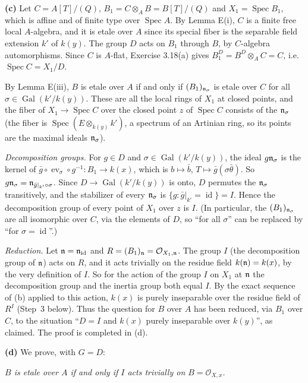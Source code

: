\documentclass[11pt]{article}
\begin{document}
\textbf{(c)} Let $C=A[T]/(Q)$, $B_1=C\otimes_AB=B[T]/(Q)$ and $X_1=\operatorname{Spec}B_1$, which is affine and of finite type over $\operatorname{Spec}A$. By Lemma E(i), $C$ is a finite free local $A$-algebra, and it is etale over $A$ since its special fiber is the separable field extension $k'$ of $k(y)$. The group $D$ acts on $B_1$ through $B$, by $C$-algebra automorphisms. Since $C$ is $A$-flat, Exercise 3.18(a) gives $B_1^D=B^D\otimes_AC=C$, i.e.\ $\operatorname{Spec}C=X_1/D$.

By Lemma E(iii), $B$ is etale over $A$ if and only if $(B_1)_{\mathfrak n_\sigma}$ is etale over $C$ for all $\sigma\in\operatorname{Gal}(k'/k(y))$. These are all the local rings of $X_1$ at closed points, and the fiber of $X_1\to\operatorname{Spec}C$ over the closed point $z$ of $\operatorname{Spec}C$ consists of the $\mathfrak n_\sigma$ (the fiber is $\operatorname{Spec}(E\otimes_{k(y)}k')$, a spectrum of an Artinian ring, so its points are the maximal ideals $\mathfrak n_\sigma$).

\emph{Decomposition groups.} For $g\in D$ and $\sigma\in\operatorname{Gal}(k'/k(y))$, the ideal $g\mathfrak n_\sigma$ is the kernel of $\bar g\circ\operatorname{ev}_\sigma\circ g^{-1}:B_1\to k(x)$, which is $b\mapsto\bar b$, $T\mapsto\bar g(\sigma\bar\theta)$. So $g\mathfrak n_\sigma=\mathfrak n_{\bar g|_{k'}\circ\sigma}$. Since $D\to\operatorname{Gal}(k'/k(y))$ is onto, $D$ permutes the $\mathfrak n_\sigma$ transitively, and the stabilizer of every $\mathfrak n_\sigma$ is $\{g:\bar g|_{k'}=\operatorname{id}\}=I$. Hence the decomposition group of every point of $X_1$ over $z$ is $I$. (In particular, the $(B_1)_{\mathfrak n_\sigma}$ are all isomorphic over $C$, via the elements of $D$, so ``for all $\sigma$'' can be replaced by ``for $\sigma=\operatorname{id}$''.)

\emph{Reduction.} Let $\mathfrak n=\mathfrak n_{\operatorname{id}}$ and $R=(B_1)_\mathfrak n=\mathcal O_{X_1,\mathfrak n}$. The group $I$ (the decomposition group of $\mathfrak n$) acts on $R$, and it acts trivially on the residue field $k(\mathfrak n)=k(x)$, by the very definition of $I$. So for the action of the group $I$ on $X_1$ at $\mathfrak n$ the decomposition group and the inertia group both equal $I$. By the exact sequence of (b) applied to this action, $k(x)$ is purely inseparable over the residue field of $R^I$ (Step~3 below). Thus the question for $B$ over $A$ has been reduced, via $B_1$ over $C$, to the situation ``$D=I$ and $k(x)$ purely inseparable over $k(y)$'', as claimed. The proof is completed in (d).

\textbf{(d)} We prove, with $G=D$:

\par\emph{$B$ is etale over $A$ if and only if $I$ acts trivially on $B=\mathcal O_{X,x}$.}\par
\end{document}
